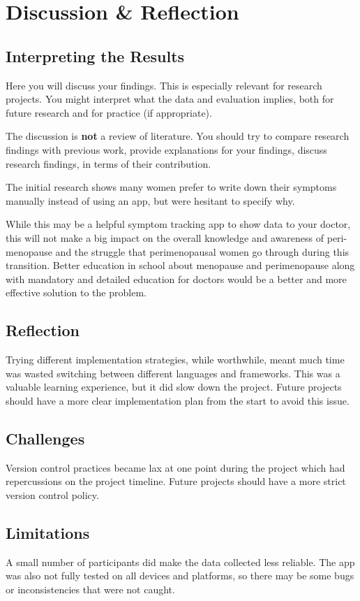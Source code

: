 \section{Discussion \& Reflection}

\subsection{Interpreting the Results}

Here you will discuss your findings. This is especially relevant for research projects. You might 
 interpret what the data and evaluation implies, both for future research and for practice (if appropriate). 
 
 The discussion is \textbf{not} a review of literature. You should try to compare research findings with previous work,
provide  explanations for your findings,
discuss  research findings, in terms of their contribution.

The initial research shows many women prefer to write down their symptoms manually instead of using an app, but were hesitant to specify why. 

While this may be a helpful symptom tracking app to show data to your doctor, this will not make a big impact on the overall knowledge and awareness of peri-menopause and the struggle that perimenopausal women go through during this transition. Better education in school about menopause and perimenopause along with mandatory and detailed education for doctors would be a better and more effective solution to the problem.

\subsection{Reflection}
Trying different implementation strategies, while worthwhile, meant much time was wasted switching between different languages and frameworks. This was a valuable learning experience, but it did slow down the project. Future projects should have a more clear implementation plan from the start to avoid this issue.

\subsection{Challenges}
Version control practices became lax at one point during the project which had repercussions on the project timeline. Future projects should have a more strict version control policy. 

\subsection{Limitations}
A small number of participants did make the data collected less reliable. The app was also not fully tested on all devices and platforms, so there may be some bugs or inconsistencies that were not caught.


